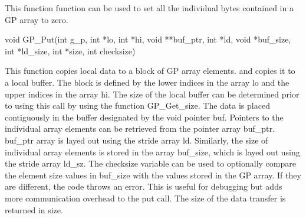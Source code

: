 \documentclass[12pt]{article}
\begin{document}
\wcoll

\begin{desc}

This function function can be used to set all the individual bytes
contained in a GP array to zero.

\end{desc}


\begin{capi}
\begin{ccode}
void GP_Put(int g_p, int *lo, int *hi, void **buf_ptr, int *ld,
             void *buf_size, int *ld_size, int *size, int checksize)
\end{ccode}
\begin{funcargs}
\end{funcargs}
\end{capi}

\ncoll

\begin{desc}

This function copies local data to a block of GP array elements.
and copies it to a local
buffer. The block is defined by the lower indices in the array lo
and the upper indices in the array hi. The size of the local buffer can be
determined prior to using this call by using the function GP\_Get\_size. The
data is placed contiguously in the buffer designated by the void pointer buf.
Pointers to the individual array elements can be retrieved from the pointer
array buf\_ptr. buf\_ptr array is layed out using the stride array ld. Similarly,
the size of individual array elements is stored in the array buf\_size, which is
layed out using the stride array ld\_sz. The checksize variable can be used to
optionally compare the element size values in buf\_size with the values stored in
the GP array. If they are different, the code throws an error. This is useful
for debugging but adds more communication overhead to the put call. The size of
the data transfer is returned in size.

\end{desc}
\end{document}
